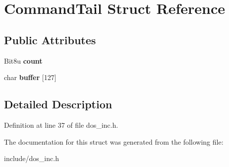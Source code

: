 \hypertarget{structCommandTail}{\section{Command\-Tail Struct Reference}
\label{structCommandTail}
}
\subsection*{Public Attributes}
\begin{DoxyCompactItemize}
\item 
\hypertarget{structCommandTail_a3d3bbe7fd2ae49bcea888d8156ababcd}{Bit8u {\bfseries count}}\label{structCommandTail_a3d3bbe7fd2ae49bcea888d8156ababcd}

\item 
\hypertarget{structCommandTail_a8c9141711800b4abd2d4276ebcdc16f8}{char {\bfseries buffer} \mbox{[}127\mbox{]}}\label{structCommandTail_a8c9141711800b4abd2d4276ebcdc16f8}

\end{DoxyCompactItemize}


\subsection{Detailed Description}


Definition at line 37 of file dos\-\_\-inc.\-h.



The documentation for this struct was generated from the following file\-:\begin{DoxyCompactItemize}
\item 
include/dos\-\_\-inc.\-h\end{DoxyCompactItemize}
